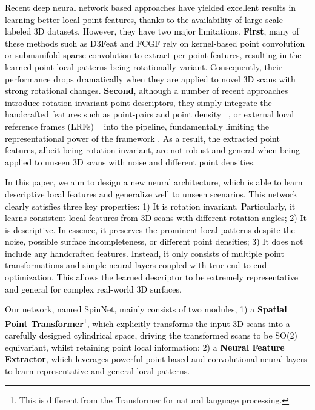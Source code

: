 \documentclass[final]{cvpr}
\newcommand{\qy}[1]{\textcolor{black}{#1}}
\newcommand{\bo}[1]{\textcolor{black}{#1}}
\newcommand{\nickname}{SpinNet}
\begin{document}
\qy{
\bo{Recent deep neural network based approaches \cite{Zeng2017,Khoury2017,Deng2018,Poiesi2021} have yielded excellent results in learning better local point features, thanks to the availability of large-scale labeled 3D datasets. However, they have two major limitations. \textbf{First}, many of these methods such as D3Feat \cite{bai2020d3feat} and FCGF \cite{choy2019fully} rely on kernel-based point convolution \cite{kpconv} or submanifold sparse convolution \cite{sparseconv} to extract per-point features, resulting in the learned point local patterns being rotationally variant. Consequently, their performance drops dramatically when they are applied to novel 3D scans with strong rotational changes. \textbf{Second}, although a number of recent approaches \cite{Deng2018,Deng2018a,Gojcic2019,li2020end} introduce rotation-invariant point descriptors, they simply integrate the handcrafted features such as point-pairs \cite{rusu2009fast,drost2010model} and point density ~\cite{Spezialetti2019a,you2020pointwise,Spezialetti2020a}, or external local reference frames (LRFs) ~\cite{li2020end,Kim2020a,Zhao2020} into the pipeline, fundamentally limiting the representational power of the framework \cite{guo2016comprehensive}. As a result, the extracted point features, albeit being rotation invariant, are not robust and general when being applied to unseen 3D scans with noise and different point densities.}} 

\bo{In this paper, we aim to design a new neural architecture, which is able to learn descriptive local features and generalize well to unseen scenarios. This network clearly satisfies three key properties: 1) It is rotation invariant. Particularly, it learns consistent local features from 3D scans with different rotation angles; 2) It is descriptive. In essence, it preserves the prominent local patterns despite the noise, possible surface incompleteness, or different point densities; 3) It does not include any handcrafted features. Instead, it only consists of multiple point transformations and simple neural layers coupled with true end-to-end optimization. This allows the learned descriptor to be extremely representative and general for complex real-world 3D surfaces.}

\bo{Our network, named \nickname{}, mainly consists of two modules, 1) a \textbf{Spatial Point Transformer}\footnote{This is different from the Transformer for natural language processing.}, which explicitly transforms the input 3D scans into a carefully designed cylindrical space, driving the transformed scans to be SO(2) equivariant, whilst retaining point local information; 2) a \textbf{Neural Feature Extractor}, which leverages powerful point-based and convolutional neural layers to learn representative and general local patterns.}
\end{document}
